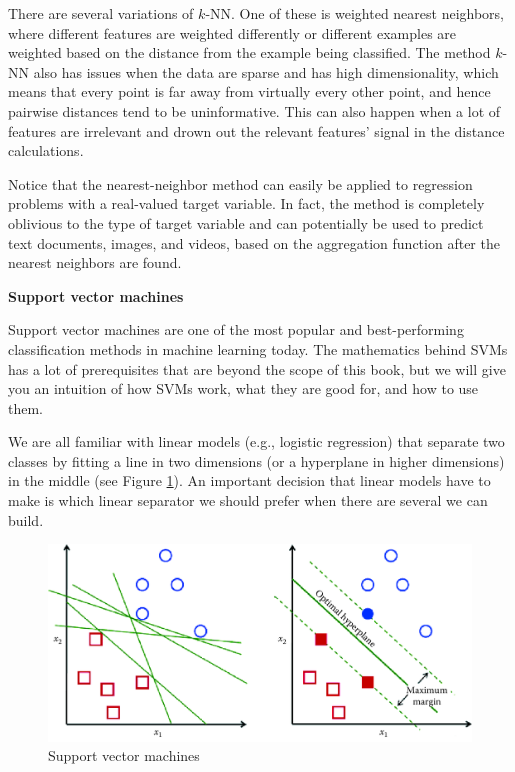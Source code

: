 \documentclass[]{krantz}
\begin{document}
There are several variations of \(k\)-NN. One of these is weighted
nearest neighbors, where different features are weighted differently or
different examples are weighted based on the distance from the example
being classified. The method \(k\)-NN also has issues when the data are
sparse and has high dimensionality, which means that every point is far
away from virtually every other point, and hence pairwise distances tend
to be uninformative. This can also happen when a lot of features are
irrelevant and drown out the relevant features' signal in the distance
calculations.

Notice that the nearest-neighbor method can easily be applied to
regression problems with a real-valued target variable. In fact, the
method is completely oblivious to the type of target variable and can
potentially be used to predict text documents, images, and videos, based
on the aggregation function after the nearest neighbors are found.

\textbf{Support vector machines}

Support vector machines are one of the most popular and best-performing
classification methods in machine learning today. The mathematics behind
SVMs has a lot of prerequisites that are beyond the scope of this book,
but we will give you an intuition of how SVMs work, what they are good
for, and how to use them.

We are all familiar with linear models (e.g., logistic regression) that
separate two classes by fitting a line in two dimensions (or a
hyperplane in higher dimensions) in the middle (see Figure
\ref{fig:svm}). An important decision that linear models have to make is
which linear separator we should prefer when there are several we can
build.

\begin{figure}

{\centering \includegraphics[width=1\linewidth]{ChapterML/figures/svm} 

}

\caption{Support vector machines}\label{fig:svm}
\end{figure}
\end{document}
